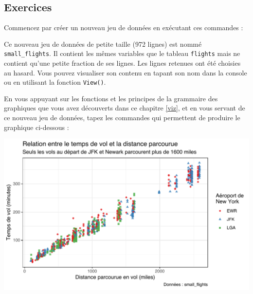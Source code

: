 \documentclass[a4paperpaper,]{article}
\newenvironment{Shaded}{\begin{snugshade}}{\end{snugshade}}
\newcommand{\DecValTok}[1]{\textcolor[rgb]{0.69,0.50,0.00}{#1}}
\newcommand{\KeywordTok}[1]{\textcolor[rgb]{0.12,0.11,0.11}{\textbf{#1}}}
\newcommand{\NormalTok}[1]{\textcolor[rgb]{0.12,0.11,0.11}{#1}}
\newcommand{\OperatorTok}[1]{\textcolor[rgb]{0.12,0.11,0.11}{#1}}
\newcommand{\StringTok}[1]{\textcolor[rgb]{0.75,0.01,0.01}{#1}}
\begin{document}
\hypertarget{exercices-6}{%
\subsection{Exercices}\label{exercices-6}}

Commencez par créer un nouveau jeu de données en exécutant ces commandes :

\begin{Shaded}
\end{Shaded}

Ce nouveau jeu de données de petite taille (972 lignes) est nommé \texttt{small\_flights}. Il contient les mêmes variables que le tableau \texttt{flights} mais ne contient qu'une petite fraction de ses lignes. Les lignes retenues ont été choisies au hasard. Vous pouvez visualiser son contenu en tapant son nom dans la console ou en utilisant la fonction \texttt{View()}.

En vous appuyant sur les fonctions et les principes de la grammaire des graphiques que vous avez découverts dans ce chapitre \ref{viz}, et en vous servant de ce nouveau jeu de données, tapez les commandes qui permettent de produire le graphique ci-dessous :

\begin{center}\includegraphics[width=0.9\linewidth]{figure/exercice-1} \end{center}
\end{document}
